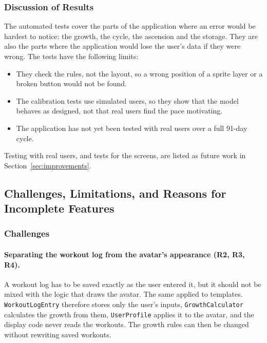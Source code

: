 \documentclass[11pt]{article}
\begin{document}
\subsubsection*{Discussion of Results}

The automated tests cover the parts of the application where an error would be hardest to notice: the growth, the cycle, the ascension and the storage. They are also the parts where the application would lose the user's data if they were wrong. The tests have the following limits:
\begin{itemize}
  \item They check the rules, not the layout, so a wrong position of a sprite layer or a broken button would not be found.
  \item The calibration tests use simulated users, so they show that the model behaves as designed, not that real users find the pace motivating.
  \item The application has not yet been tested with real users over a full 91-day cycle.
\end{itemize}
Testing with real users, and tests for the screens, are listed as future work in Section~\ref{sec:improvements}.
\subsection{Challenges, Limitations, and Reasons for Incomplete Features}
\label{sec:challenges}

\subsubsection{Challenges}

\paragraph{Separating the workout log from the avatar's appearance (R2, R3, R4).}
A workout log has to be saved exactly as the user entered it, but it should not be mixed with the logic that draws the avatar. The same applied to templates. \texttt{WorkoutLogEntry} therefore stores only the user's inputs, \texttt{GrowthCalculator} calculates the growth from them, \texttt{UserProfile} applies it to the avatar, and the display code never reads the workouts. The growth rules can then be changed without rewriting saved workouts.
\end{document}

